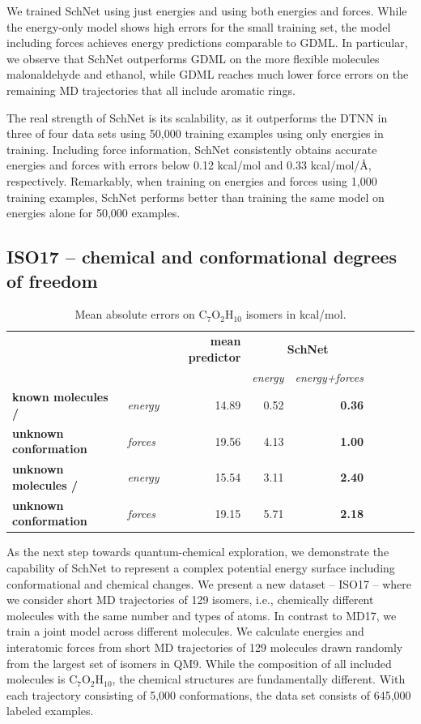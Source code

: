 \documentclass{article}
\begin{document}
We trained SchNet using just energies and using both energies and forces.
While the energy-only model shows high errors for the small training set, the model including forces achieves energy predictions comparable to GDML.
In particular, we observe that SchNet outperforms GDML on the more flexible molecules malonaldehyde and ethanol, while GDML reaches much lower force errors on the remaining MD trajectories that all include aromatic rings.

The real strength of SchNet is its scalability, as it outperforms the DTNN in three of four data sets using 50,000 training examples using only energies in training.
Including force information, SchNet consistently obtains accurate energies and forces with errors below 0.12 kcal/mol and 0.33 kcal/mol/{\AA}, respectively. 
Remarkably, when training on energies and forces using 1,000 training examples, SchNet performs better than training the same model on energies alone for 50,000 examples.

\subsection{ISO17 -- chemical and conformational degrees of freedom}
\begin{table}
\caption{Mean absolute errors on C$_7$O$_2$H$_{10}$ isomers in kcal/mol.}\label{tab:isomer}
\centering
\small
\begin{tabular}{llrrrrrrr}
\toprule
 & & \textbf{mean predictor} & \multicolumn{2}{c}{\textbf{SchNet}} \\
 & &                         & \textit{energy} & \textit{energy+forces} \\ \midrule
\textbf{known molecules /} &   \textit{energy}   & 14.89 & 0.52 & \textbf{0.36}\\
\textbf{unknown conformation} & \textit{forces} & 19.56 & 4.13 & \textbf{1.00} \\ \midrule
\textbf{unknown molecules /} & \textit{energy}   & 15.54 & 3.11 & \textbf{2.40} \\
\textbf{unknown conformation} & \textit{forces} & 19.15 & 5.71 & \textbf{2.18} \\
\bottomrule
\end{tabular}
\end{table}
%
As the next step towards quantum-chemical exploration, we demonstrate the capability of SchNet to represent a complex potential energy surface including conformational and chemical changes.
We present a new dataset -- ISO17 -- where we consider short MD trajectories of 129 isomers, i.e., chemically different molecules with the same number and types of atoms.
In contrast to MD17, we train a joint model across different molecules.
We calculate energies and interatomic forces from short MD trajectories of 129 molecules drawn randomly from the largest set of isomers in QM9.
While the composition of all included molecules is C$_7$O$_2$H$_{10}$, the chemical structures are fundamentally different.
With each trajectory consisting of 5,000 conformations, the data set consists of 645,000 labeled examples.
\end{document}
